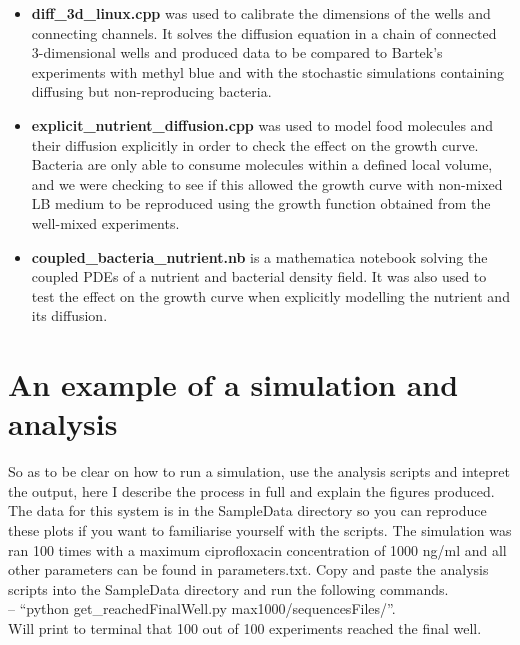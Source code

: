 \documentclass[a4paper,10pt]{article}
\begin{document}
\begin{itemize}
 \item {\bf diff\_3d\_linux.cpp} was used to calibrate the dimensions of the wells and connecting channels. It solves the diffusion equation in a chain of connected
 3-dimensional wells and produced data to be compared to Bartek's experiments with methyl blue and with the stochastic simulations containing diffusing
 but non-reproducing bacteria.
 \item {\bf explicit\_nutrient\_diffusion.cpp} was used to model food molecules and their diffusion explicitly in order to check the effect on the growth curve. 
 Bacteria are only able to consume molecules within a defined local volume,
 and we were checking to see if this allowed the growth curve with non-mixed LB medium to be reproduced using the growth function obtained from the well-mixed experiments.
 \item {\bf coupled\_bacteria\_nutrient.nb} is a mathematica notebook solving the coupled PDEs of a nutrient and bacterial density field. It was also used to test the effect 
 on the growth curve when explicitly modelling the nutrient and its diffusion.
\end{itemize}
 
 

 
 
 
 
 
 
 
 
 
 
 
 
 \clearpage
 \newpage
 
\section{An example of a simulation and analysis}\label{sec:Ex}
So as to be clear on how to run a simulation, use the analysis scripts and intepret the output, here I describe the process in full and explain the figures produced.
The data for this system is in the SampleData directory so you can reproduce these plots if you want to familiarise yourself with the scripts.
The simulation was ran 100 times with a maximum ciprofloxacin concentration of 1000 ng/ml and all other parameters can be found in parameters.txt.
Copy and paste the analysis scripts into the SampleData directory and run the following commands.\\


 
-- ``python get\_reachedFinalWell.py max1000/sequencesFiles/''.\\
Will print to terminal that 100 out of 100 experiments reached the final well.\\
\end{document}
